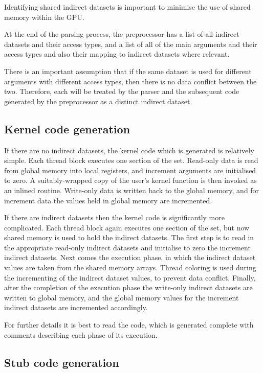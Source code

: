 \documentclass[12pt]{article}
\begin{document}
\begin{itemize}
Identifying shared indirect datasets is important to minimise
the use of shared memory within the GPU.

At the end of the parsing process, the preprocessor has a 
list of all indirect datasets and their access types, and a 
list of all of the main arguments and their access types and 
also their mapping to indirect datasets where relevant.

There is an important assumption that if the same dataset is
used for different arguments with different access types, then
there is no data conflict between the two.  Therefore, each will
be treated by the parser and the subsequent code generated by 
the preprocessor as a distinct indirect dataset.

\subsection{Kernel code generation}

If there are no indirect datasets, the kernel code which is 
generated is relatively simple.  Each thread block executes
one section of the set.  Read-only data is read from global 
memory into local registers, and increment arguments are 
initialised to zero.  A suitably-wrapped copy of the user's 
kernel function is then invoked as an inlined routine.  
Write-only data is written back to the global memory, and
for increment data the values held in global memory are 
incremented.


If there are indirect datasets then the kernel code is 
significantly more complicated.  Each thread block again
executes one section of the set, but now shared memory
is used to hold the indirect datasets.  The first step 
is to read in the appropriate read-only indirect datasets 
and initialise to zero the increment indirect datasets.
Next comes the execution phase, in which the indirect 
dataset values are taken from the shared memory arrays.
Thread coloring is used during the incrementing of the 
indirect dataset values, to prevent data conflict.
Finally, after the completion of the execution phase
the write-only indirect datasets are written to global 
memory, and the global memory values for the increment 
indirect datasets are incremented accordingly.

For further details it is best to read the code, which 
is generated complete with comments describing each 
phase of its execution.

\subsection{Stub code generation}


\end{itemize}
\end{document}
